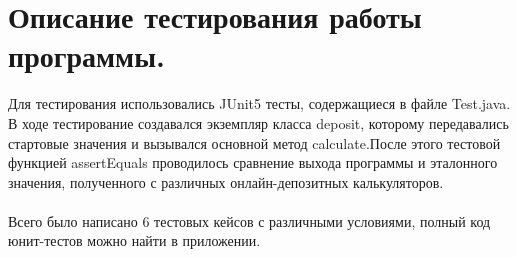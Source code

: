 \section{Описание тестирования работы программы.}
Для тестирования использовались JUnit5 тесты, содержащиеся в файле Test.java.
\\В ходе тестирование создавался экземпляр класса deposit, которому передавались стартовые значения и вызывался основной метод calculate.После этого тестовой функцией assertEquals проводилось сравнение выхода программы и эталонного значения, полученного с различных онлайн-депозитных калькуляторов.\\
\\Всего было написано 6 тестовых кейсов с различными условиями, полный код юнит-тестов можно найти в приложении.
